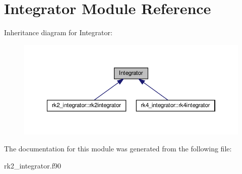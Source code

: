 \hypertarget{classIntegrator}{}\section{Integrator Module Reference}
\label{classIntegrator}


Inheritance diagram for Integrator\+:\nopagebreak
\begin{figure}[H]
\begin{center}
\leavevmode
\includegraphics[width=350pt]{classIntegrator__inherit__graph}
\end{center}
\end{figure}


The documentation for this module was generated from the following file\+:\begin{DoxyCompactItemize}
\item 
rk2\+\_\+integrator.\+f90\end{DoxyCompactItemize}
